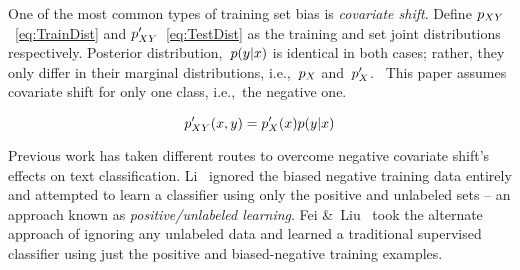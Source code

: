 \documentclass[]{subfiles}
\begin{document}
One of the most common types of training set bias is \textit{covariate shift}. Define $p_{XY}$~\eqref{eq:TrainDist} and ${p_{XY}'}$~\eqref{eq:TestDist} as the training and set joint distributions respectively.  Posterior distribution,~${p(y \vert x)}$ is identical in both cases; rather, they only differ in their marginal distributions, i.e.,~$p_{X}$ and~${p_{X}'}$.~\cite{Huang:2006}  This paper assumes covariate shift for only one class, i.e.,~the negative one.

\begin{equation}\label{eq:TestDist}
    p_{XY}'(x,y) = p_{X}'(x) p(y \vert x)
\end{equation}

Previous work has taken different routes to overcome negative covariate shift's effects on text classification.  Li\etal~\cite{Li:2010} ignored the biased negative training data entirely and attempted to learn a classifier using only the positive and unlabeled sets -- an approach known as \textit{positive\-/unlabeled learning}.  Fei \&~Liu~\cite{Fei:2015} took the alternate approach of ignoring any unlabeled data and learned a traditional supervised classifier using just the positive and biased-negative training examples.
\end{document}
